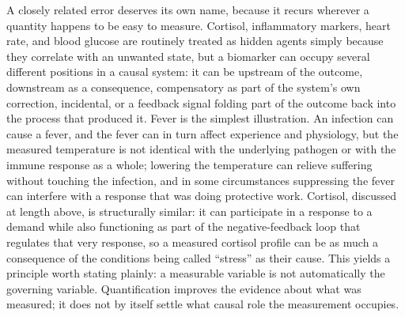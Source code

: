\documentclass[11pt]{article}
\begin{document}
A closely related error deserves its own name, because it recurs wherever a quantity happens to be easy to measure. Cortisol, inflammatory markers, heart rate, and blood glucose are routinely treated as hidden agents simply because they correlate with an unwanted state, but a biomarker can occupy several different positions in a causal system: it can be upstream of the outcome, downstream as a consequence, compensatory as part of the system's own correction, incidental, or a feedback signal folding part of the outcome back into the process that produced it. Fever is the simplest illustration. An infection can cause a fever, and the fever can in turn affect experience and physiology, but the measured temperature is not identical with the underlying pathogen or with the immune response as a whole; lowering the temperature can relieve suffering without touching the infection, and in some circumstances suppressing the fever can interfere with a response that was doing protective work. Cortisol, discussed at length above, is structurally similar: it can participate in a response to a demand while also functioning as part of the negative-feedback loop that regulates that very response, so a measured cortisol profile can be as much a consequence of the conditions being called ``stress'' as their cause. This yields a principle worth stating plainly: a measurable variable is not automatically the governing variable. Quantification improves the evidence about what was measured; it does not by itself settle what causal role the measurement occupies.
\end{document}
